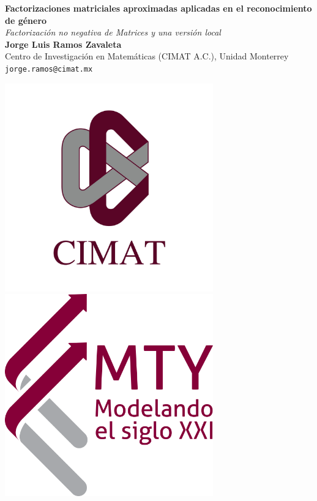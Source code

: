 \documentclass[a0,portrait]{a0poster}
\begin{document}


\begin{minipage}[b]{0.75\linewidth}
\VeryHuge \color{NavyBlue} \textbf{Factorizaciones matriciales
aproximadas aplicadas en el reconocimiento de g\'enero} \color{Black}\\ %
\Huge\textit{Factorizaci\'on no negativa de Matrices y una versi\'on local}\\[2.4cm] %
\huge \textbf{Jorge Luis Ramos Zavaleta}\\[0.5cm] %
\huge Centro de Investigaci\'on en Matem\'aticas (CIMAT A.C.), Unidad Monterrey\\[0.4cm] %
\Large \texttt{jorge.ramos@cimat.mx} \\
\end{minipage}
%
\begin{minipage}[b]{0.25\linewidth}
\includegraphics[width=9cm]{logo_cimat.jpg}\ 
\includegraphics[width=9cm]{logo_U_Mty.png}\\
\end{minipage}
\end{document}
